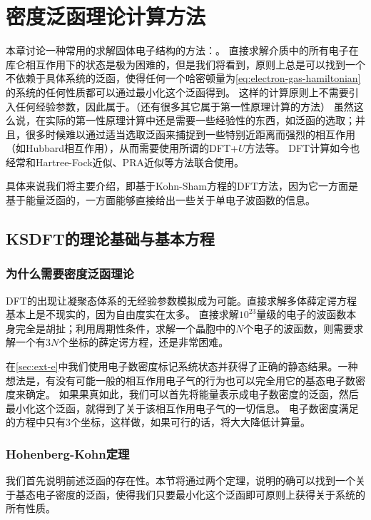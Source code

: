 \chapter{密度泛函理论计算方法}\label{chap:dft}

本章讨论一种常用的求解固体电子结构的方法：。
直接求解介质中的所有电子在库仑相互作用下的状态是极为困难的，但是我们将看到，原则上总是可以找到一个不依赖于具体系统的泛函，使得任何一个哈密顿量为\eqref{eq:electron-gas-hamiltonian}的系统的任何性质都可以通过最小化这个泛函得到。
这样的计算原则上不需要引入任何经验参数，因此属于。（还有很多其它属于第一性原理计算的方法）
虽然这么说，在实际的第一性原理计算中还是需要一些经验性的东西，如泛函的选取；并且，很多时候难以通过适当选取泛函来捕捉到一些特别近距离而强烈的相互作用（如Hubbard相互作用），从而需要使用所谓的DFT+$U$方法等。
DFT计算如今也经常和Hartree-Fock近似、PRA近似等方法联合使用。

具体来说我们将主要介绍，即基于Kohn-Sham方程的DFT方法，因为它一方面是基于能量泛函的，一方面能够直接给出一些关于单电子波函数的信息。

\section{KSDFT的理论基础与基本方程}

\subsection{为什么需要密度泛函理论}

DFT的出现让凝聚态体系的无经验参数模拟成为可能。直接求解多体薛定谔方程基本上是不现实的，因为自由度实在太多。
直接求解$10^{23}$量级的电子的波函数本身完全是胡扯；利用周期性条件，求解一个晶胞中的$N$个电子的波函数，则需要求解一个有$3N$个坐标的薛定谔方程，还是非常困难。

在\autoref{sec:ext-e}中我们使用电子数密度标记系统状态并获得了正确的静态结果。一种想法是，有没有可能一般的相互作用电子气的行为也可以完全用它的基态电子数密度来确定。
如果果真如此，我们可以首先将能量表示成电子数密度的泛函，然后最小化这个泛函，就得到了关于该相互作用电子气的一切信息。
电子数密度满足的方程中只有$3$个坐标，这样做，如果可行的话，将大大降低计算量。

\subsection{Hohenberg-Kohn定理}

我们首先说明前述泛函的存在性。本节将通过两个定理，说明的确可以找到一个关于基态电子密度的泛函，使得我们只要最小化这个泛函即可原则上获得关于系统的所有性质。

